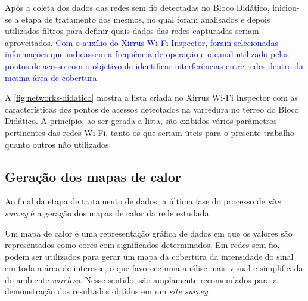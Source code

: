 Após a coleta dos dados das redes sem fio detectadas no Bloco Didático, iniciou-se a etapa de tratamento dos mesmos, no qual foram analisados e depois utilizados filtros para definir quais dados das redes capturadas seriam aproveitados. \textcolor{blue}{Com o auxílio do Xirrus Wi-Fi Inspector, foram selecionadas informações que indicassem a frequência de operação e o canal utilizado pelos pontos de acesso com o objetivo de identificar interferências entre redes dentro da mesma área de cobertura.}

A \autoref{fig:networks-didatico} mostra a lista criada no Xirrus Wi-Fi Inspector com as características dos pontos de acessos detectados na varredura no térreo do Bloco Didático. A princípio, ao ser gerada a lista, são exibidos vários parâmetros pertinentes das redes Wi-Fi, tanto os que seriam úteis para o presente trabalho quanto outros não utilizados.

\begin{figure}[H]
	\centering
\end{figure}

\subsection{Geração dos mapas de calor}
\label{subsec:mapas-de-calor}

Ao final da etapa de tratamento de dados, a última fase do processo de \textit{site survey} é a geração dos mapas de calor da rede estudada.

Um mapa de calor é uma representação gráfica de dados em que os valores são representados como cores com significados determinados. Em redes sem fio, podem ser utilizados para gerar um mapa da cobertura da intensidade do sinal em toda a área de interesse, o que favorece uma análise mais visual e simplificada do ambiente \textit{wireless}. Nesse sentido, são amplamente recomendados para a demonstração dos resultados obtidos em um \textit{site survey}.

